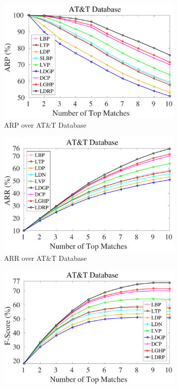 \documentclass[a4paper]{article}
\begin{document}
\begin{figure}[!t]
  \begin{subfigure}{.25\textwidth}
    \centering
    \includegraphics[width=.98\linewidth]{att-arp}
    \caption{ARP over AT\&T Database}
    \label{fig:att-arp}
  \end{subfigure}%
    \begin{subfigure}{.25\textwidth}
    \centering
    \includegraphics[width=.98\linewidth]{att-arr}
    \caption{ARR over AT\&T Database}
    \label{fig:att-arr}
  \end{subfigure}%
    \begin{subfigure}{.25\textwidth}
    \centering
    \includegraphics[width=.98\linewidth]{att-f}

\end{subfigure}
\end{figure}
\end{document}
